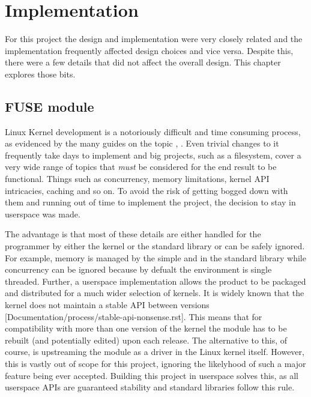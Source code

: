 \chapter{Implementation}

    For this project the design and implementation were very closely related
    and the implementation frequently affected design choices and vice versa.
    Despite this, there were a few details that did not affect the overall
    design. This chapter explores those bits.

    \section{FUSE module}
        \label{sec_FUSE}

        Linux Kernel development is a notoriously difficult and time consuming
        process, as evidenced by the many guides on the topic
        \cite{kernelnewbies_developer}, \cite{Linux_howto}. Even trivial
        changes to it frequently take days to implement and big projects, such
        as a filesystem, cover a very wide range of topics that \textit{must}
        be considered for the end result to be functional. Things such as
        concurrency, memory limitations, kernel API intricacies, caching and so
        on. To avoid the risk of getting bogged down with them and running out
        of time to implement the project, the decision to stay in userspace was
        made.

        The advantage is that most of these details are either handled for the
        programmer by either the kernel or the standard library or can be
        safely ignored. For example, memory is managed by the simple
         and  in the standard library while
        concurrency can be ignored because by defualt the environment is single
        threaded. Further, a userspace implementation allows the product to be
        packaged and distributed for a much wider selection of kernels. It is
        widely known that the kernel does not maintain a stable API between
        versions
        \cite{Linux_source}[Documentation/process/stable-api-nonsense.rst].
        This means that for compatibility with more than one version of the
        kernel the module has to be rebuilt (and potentially edited) upon each
        release. The alternative to this, of course, is upstreaming the module
        as a driver in the Linux kernel itself. However, this is vastly out of
        scope for this project, ignoring the likelyhood of such a major feature
        being ever accepted. Building this project in userspace solves this, as
        all userspace APIs are guaranteed stability
        \cite{never_break_userspace} and standard libraries follow this rule.

